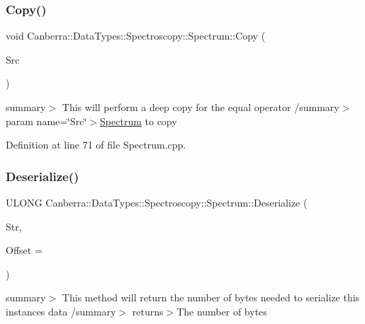\subsubsection{\texorpdfstring{Copy()}{Copy()}}
{\footnotesize\ttfamily void Canberra\+::\+Data\+Types\+::\+Spectroscopy\+::\+Spectrum\+::\+Copy (\begin{DoxyParamCaption}\item[{const \hyperlink{class_canberra_1_1_data_types_1_1_spectroscopy_1_1_spectrum}{Spectrum} \&}]{Src }\end{DoxyParamCaption})\hspace{0.3cm}{\ttfamily [protected]}}

summary$>$ This will perform a deep copy for the equal operator /summary$>$ param name=\char`\"{}\+Src\char`\"{}$>$\hyperlink{class_canberra_1_1_data_types_1_1_spectroscopy_1_1_spectrum}{Spectrum} to copy

Definition at line 71 of file Spectrum.\+cpp.

\mbox{\label{class_canberra_1_1_data_types_1_1_spectroscopy_1_1_spectrum_a49ea96089690bc9c4dbe010785f72252_a49ea96089690bc9c4dbe010785f72252}} 
\subsubsection{\texorpdfstring{Deserialize()}{Deserialize()}}
{\footnotesize\ttfamily U\+L\+O\+NG Canberra\+::\+Data\+Types\+::\+Spectroscopy\+::\+Spectrum\+::\+Deserialize (\begin{DoxyParamCaption}\item[{\hyperlink{class_canberra_1_1_utility_1_1_core_1_1_byte_stream}{Canberra\+::\+Utility\+::\+Core\+::\+Byte\+Stream} \&}]{Str,  }\item[{const L\+O\+NG}]{Offset = {} }\end{DoxyParamCaption})\hspace{0.3cm}{\ttfamily [virtual]}}

summary$>$ This method will return the number of bytes needed to serialize this instances data /summary$>$ returns$>$The number of bytes

